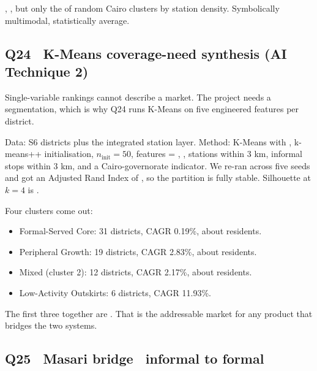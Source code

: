 
, , but only the  of random Cairo clusters
by station density. Symbolically multimodal, statistically average.

\subsection{Q24 \textbullet\ K-Means coverage-need synthesis (AI Technique 2)}

Single-variable rankings cannot describe a market. The project needs
a segmentation, which is why Q24 runs K-Means on five engineered
features per district.

Data: S6 districts plus the integrated station layer. Method: K-Means
with , k-means++ initialisation, $n_{\text{init}}=50$,
features = , , stations within 3 km,
informal stops within 3 km, and a Cairo-governorate indicator. We
re-ran across five seeds and got an Adjusted Rand Index of
, so the partition is fully stable. Silhouette at $k=4$ is
.


Four clusters come out:

\begin{itemize}
  \item Formal-Served Core: 31 districts, CAGR 0.19\%, about
         residents.
  \item Peripheral Growth: 19 districts, CAGR 2.83\%, about
         residents.
  \item Mixed (cluster 2): 12 districts, CAGR 2.17\%, about
         residents.
  \item Low-Activity Outskirts: 6 districts, CAGR 11.93\%.
\end{itemize}

The first three together are . That is the addressable market for any product that
bridges the two systems.

\subsection{Q25 \textbullet\ Masari bridge \textbullet\ informal to formal}

